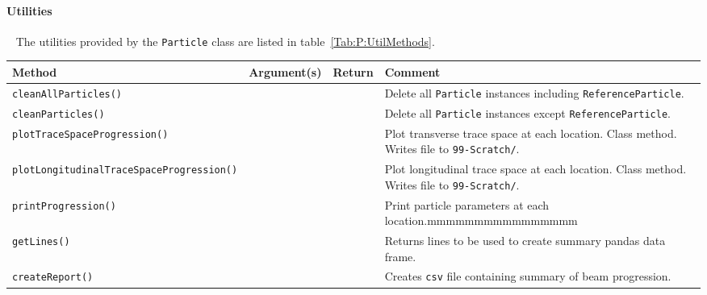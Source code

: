 \paragraph{Utilities} ~\newline
\noindent
The utilities provided by the \texttt{Particle} class are listed in
table~\ref{Tab:P:UtilMethods}.
\begin{sidewaystable}[h]
  \caption{
    Utilities provided by the \texttt{Particle}
    class. 
  }
  \label{Tab:P:UtilMethods}
  \begin{center}
    \begin{tabular}{|l|c|c|p{10cm}|}
      \hline
      \textbf{Method} & \textbf{Argument(s)} & \textbf{Return} & \textbf{Comment}                                          \\
      \hline
      \texttt{cleanAllParticles()}&  &  & Delete all \texttt{Particle} instances including \texttt{ReferenceParticle}.     \\
      \texttt{cleanParticles()}   &  &  & Delete all \texttt{Particle} instances except \texttt{ReferenceParticle}.        \\
      \texttt{plotTraceSpaceProgression()} &  &  & Plot transverse trace space at each location.  Class method.  Writes file to
                                                   \texttt{99-Scratch/}.                                                   \\
      \texttt{plotLongitudinalTraceSpaceProgression()} &  &  & Plot longitudinal trace space at each location.  Class method.  Writes file to
                                                   \texttt{99-Scratch/}.                                                   \\
      \texttt{printProgression()} &  &  & Print particle parameters at each location.mmmmmmmmmmmmmmmm                      \\
      \texttt{getLines()}         &  &  & Returns lines to be used to create summary pandas data frame.                    \\
      \texttt{createReport()}     &  &  & Creates \texttt{csv} file containing summary of beam progression.                \\
      \hline
    \end{tabular}
  \end{center}
\end{sidewaystable}

\FloatBarrier

\pagebreak

